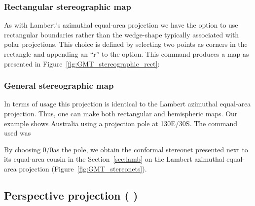 
\subsubsection{Rectangular stereographic map} 

As with Lambert's azimuthal equal-area projection we have
the option to use rectangular boundaries rather than the
wedge-shape typically associated with polar projections.
This choice is defined by selecting two points as corners
in the rectangle and appending an ``r'' to the  option.
This command produces a map as presented in
Figure~\ref{fig:GMT_stereographic_rect}:


\subsubsection{General stereographic map}

In terms of usage this projection is identical to the Lambert
azimuthal equal-area projection.  Thus, one can make both
rectangular and hemispheric maps.  Our example shows Australia
using a projection pole at 130E/30\DS S.  The command used was



By choosing 0\DS/0\DS  as the pole, we obtain the conformal
stereonet presented next to its equal-area cousin in the Section~\ref{sec:lamb} on
the Lambert azimuthal equal-area projection (Figure~\ref{fig:GMT_stereonets}).


\subsection{Perspective projection ( )}

